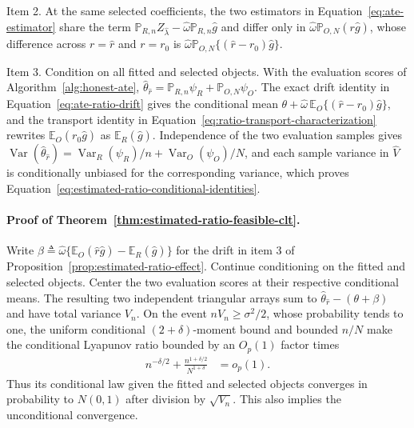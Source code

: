 Item 2. At the same selected coefficients, the two estimators in Equation~\eqref{eq:ate-estimator} share the term $\mathbb P_{R,n}Z_{\widehat\lambda}-\widehat\omega\mathbb P_{R,n}\widehat g$ and differ only in $\widehat\omega\mathbb P_{O,N}(r\widehat g)$, whose difference across $r=\widehat r$ and $r=r_0$ is $\widehat\omega\mathbb P_{O,N}\{(\widehat r-r_0)\widehat g\}$.

Item 3. Condition on all fitted and selected objects. With the evaluation scores of Algorithm~\ref{alg:honest-ate}, $\widehat\theta_{\widehat r}=\mathbb P_{R,n}\psi_R+\mathbb P_{O,N}\psi_O$. The exact drift identity in Equation~\eqref{eq:ate-ratio-drift} gives the conditional mean $\theta+\widehat\omega\,\mathbb E_O\{(\widehat r-r_0)\widehat g\}$, and the transport identity in Equation~\eqref{eq:ratio-transport-characterization} rewrites $\mathbb E_O(r_0\widehat g)$ as $\mathbb E_R(\widehat g)$. Independence of the two evaluation samples gives $\operatorname{Var}(\widehat\theta_{\widehat r})=\operatorname{Var}_R(\psi_R)/n+\operatorname{Var}_O(\psi_O)/N$, and each sample variance in $\widehat V$ is conditionally unbiased for the corresponding variance, which proves Equation~\eqref{eq:estimated-ratio-conditional-identities}.

\paragraph{Proof of Theorem~\ref{thm:estimated-ratio-feasible-clt}.}
Write $\beta\triangleq\widehat\omega\{\mathbb E_O(\widehat r\widehat g)-\mathbb E_R(\widehat g)\}$ for the drift in item 3 of Proposition~\ref{prop:estimated-ratio-effect}. Continue conditioning on the fitted and selected objects. Center the two
evaluation scores at their respective conditional means. The resulting two
independent triangular arrays sum to
$\widehat\theta_{\widehat r}-(\theta+\beta)$ and have total variance
$V_n$. On the event
$nV_n\geq\sigma^2/2$, whose probability tends to one, the uniform
conditional $(2+\delta)$-moment bound and bounded $n/N$ make the conditional
Lyapunov ratio bounded by an $O_p(1)$ factor times
\begin{align*}
n^{-\delta/2}+\frac{n^{1+\delta/2}}{N^{1+\delta}}
&=o_p(1).
\end{align*}
Thus its conditional law given the fitted and selected objects converges in
probability to $N(0,1)$ after division by $\sqrt{V_n}$. This also
implies the unconditional convergence.

